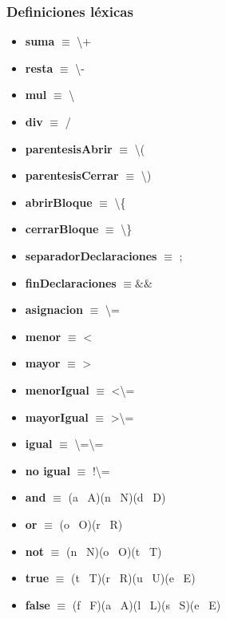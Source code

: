 \documentclass[11pt]{article}
\begin{document}
        \subsubsection*{Definiciones léxicas}
        \begin{itemize}
            \item \textbf{suma }$\equiv$ \textbackslash+
            \item \textbf{resta }$\equiv$ \textbackslash-
            \item \textbf{mul }$\equiv$ \textbackslash*
            \item \textbf{div }$\equiv$ /
            \item \textbf{parentesisAbrir }$\equiv$ \textbackslash(
            \item \textbf{parentesisCerrar }$\equiv$ \textbackslash)
            \item \textbf{abrirBloque }$\equiv$ \textbackslash\{
            \item \textbf{cerrarBloque }$\equiv$ \textbackslash\}
            \item \textbf{separadorDeclaraciones }$\equiv$ ;
            \item \textbf{finDeclaraciones }$\equiv \&\& $
            \item \textbf{asignacion }$\equiv$ \textbackslash=
            \item \textbf{menor }$\equiv$ \textless
            \item \textbf{mayor }$\equiv$ \textgreater
            \item \textbf{menorIgual }$\equiv$ \textless\textbackslash=
            \item \textbf{mayorIgual }$\equiv$ \textgreater\textbackslash=
            \item \textbf{igual }$\equiv$ \textbackslash=\textbackslash=
            \item \textbf{no igual }$\equiv$ !\textbackslash=
            \item \textbf{and }$\equiv$ (a \textbar\ A)(n \textbar\ N)(d \textbar\ D)
            \item \textbf{or }$\equiv$ (o \textbar\ O)(r \textbar\ R)
            \item \textbf{not }$\equiv$ (n \textbar\ N)(o \textbar\ O)(t \textbar\ T)
            \item \textbf{true }$\equiv$ (t \textbar\ T)(r \textbar\ R)(u \textbar\ U)(e \textbar\ E)
            \item \textbf{false }$\equiv$ (f \textbar\ F)(a \textbar\ A)(l \textbar\ L)(s \textbar\ S)(e \textbar\ E)

\end{itemize}
\end{document}
